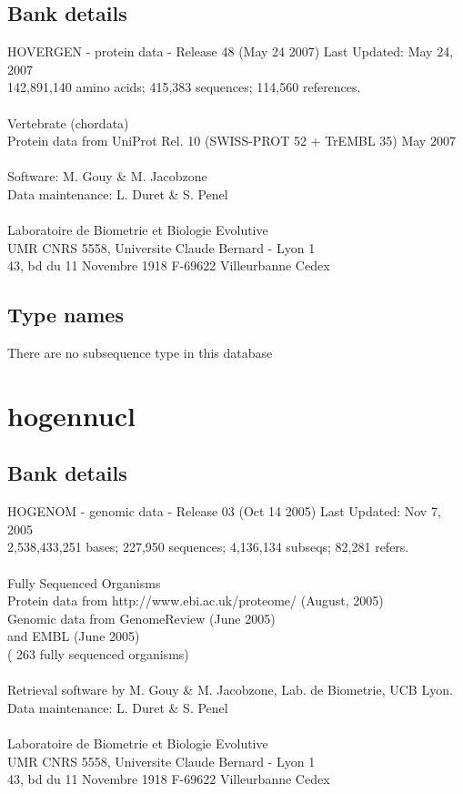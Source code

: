\documentclass{article}
\begin{document}
\begin{Schunk}
\subsection{Bank details}
HOVERGEN - protein data - Release 48 (May 24 2007) Last Updated: May 24, 2007\\
142,891,140 amino acids; 415,383 sequences; 114,560 references.\\
\\
Vertebrate (chordata)\\
Protein data from UniProt Rel. 10 (SWISS-PROT 52 + TrEMBL 35) May 2007\\
\\
Software: M. Gouy \& M. Jacobzone\\
Data maintenance: L. Duret \& S. Penel\\
\\
Laboratoire de Biometrie et Biologie Evolutive\\
UMR CNRS 5558, Universite Claude Bernard - Lyon 1\\
43, bd du 11 Novembre 1918 F-69622 Villeurbanne Cedex\\


\subsection{Type names}
There are no subsequence type in this database
\section{ hogennucl }
\subsection{Bank details}
HOGENOM - genomic data - Release 03 (Oct 14 2005) Last Updated: Nov  7, 2005\\
2,538,433,251 bases; 227,950 sequences; 4,136,134 subseqs; 82,281 refers.\\
\\
Fully Sequenced Organisms\\
Protein data from http://www.ebi.ac.uk/proteome/ (August, 2005)\\
Genomic data from GenomeReview  (June 2005)\\
and  EMBL (June 2005)\\
( 263 fully sequenced organisms)\\
\\
Retrieval software by M. Gouy \& M. Jacobzone, Lab. de Biometrie, UCB Lyon.\\
Data maintenance: L. Duret \& S. Penel\\
\\
Laboratoire de Biometrie et Biologie Evolutive\\
UMR CNRS 5558, Universite Claude Bernard - Lyon 1\\
43, bd du 11 Novembre 1918 F-69622 Villeurbanne Cedex\\



\end{Schunk}
\end{document}
